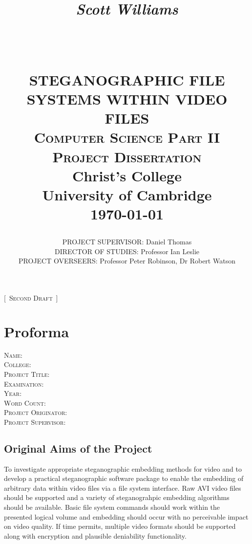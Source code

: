 \documentclass[paper=a4, fontsize=11pt,twoside]{scrartcl}
\title{
	\begin{flushright}
		\LARGE{\textit{Scott Williams}}
	\end{flushright}
	~\\[2.0cm]			
	\HRule{0.5pt} \\                        
    \LARGE \textbf{\uppercase{Steganographic file systems within video files}}    
    \HRule{2pt} \\[30pt]        
	\normalsize \textsc{Computer Science Part II Project Dissertation}\\[2.0cm]     
    \normalsize Christ's College\\[5pt]University of Cambridge\\[25pt]           
    \normalsize \today            
}
\author{
    \begin{spacing}{1.5}
        \noindent
        \uppercase{Project Supervisor}: Daniel Thomas\\    
        \uppercase{Director of Studies}: Professor Ian Leslie\\    
        \uppercase{Project Overseers}: Professor Peter Robinson, Dr Robert Watson\\
    \end{spacing}
}
\makeatletter
\numberwithin{table}{section}
\numberwithin{figure}{section}
\numberwithin{algorithm}{section}
\def\printtitle{%
    {\centering \@title\par}}
\newcommand\blankpage{%
    \null
    \thispagestyle{empty}%
    \addtocounter{page}{-1}%
    \newpage}
\makeatother
\begin{document}
\renewcommand{\thelstlisting}{\thesection.\arabic{lstlisting}}
\thispagestyle{empty}        

\printtitle                    
\vfill
\begin{center}
\huge{[~}\normalsize \textsc{Second Draft}\huge{~]}
\end{center}
\afterpage{\blankpage}
\newpage
\setcounter{page}{1}        
\section*{Proforma}
\textsc{Name}: \\
\textsc{College}: \\
\textsc{Project Title}: \\
\textsc{Examination}: \\
\textsc{Year}: \\
\textsc{Word Count}: \\
\textsc{Project Originator}: \\
\textsc{Project Supervisor}: \\

\subsection*{Original Aims of the Project}
To investigate appropriate steganographic embedding methods for video and to develop a practical steganographic software package to enable the embedding of arbitrary data within video files via a file system interface. Raw AVI video files should be supported and a variety of steganograhpic embedding algorithms should be available. Basic file system commands should work within the presented logical volume and embedding should occur with no perceivable impact on video quality. If time permits, multiple video formats should be supported along with encryption and plausible deniability functionality.
\end{document}
